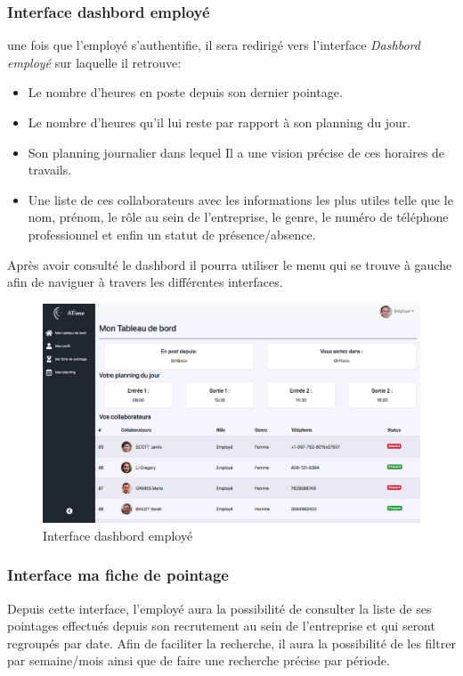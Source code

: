 \subsubsection*{Interface dashbord employé}
une fois que l’employé s'authentifie, il sera redirigé vers l’interface
\emph{Dashbord employé} sur laquelle il retrouve:

\begin{itemize}
    \item[\textbullet] Le nombre d’heures en poste depuis son dernier pointage.
    \item[\textbullet] Le nombre d’heures qu’il lui reste par rapport à son
        planning du jour.
    \item[\textbullet] Son planning journalier dans lequel Il a une vision
        précise de ces horaires de travails.
    \item[\textbullet] Une liste de ces collaborateurs avec les informations les
        plus utiles telle que le nom, prénom, le rôle au sein de l’entreprise,
        le genre, le numéro de téléphone professionnel et enfin un statut de
        présence/absence.
\end{itemize}

Après avoir consulté le dashbord il pourra utiliser le menu qui se trouve à 
gauche afin de naviguer à travers les différentes interfaces.

\begin{figure}[h!]
    \centering
    \includegraphics[scale=0.35 ]{images/interface/dashbord_employe.png}
    \caption{Interface dashbord employé}
    \label{fig92}
\end{figure}

\subsubsection*{Interface ma fiche de pointage}
Depuis cette interface, l’employé aura la possibilité de consulter la liste de 
ses pointages effectués depuis son recrutement au sein de l’entreprise et qui 
seront regroupés par date. Afin de faciliter la recherche, il aura la 
possibilité de les filtrer par semaine/mois ainsi que de faire une recherche 
précise par période.

